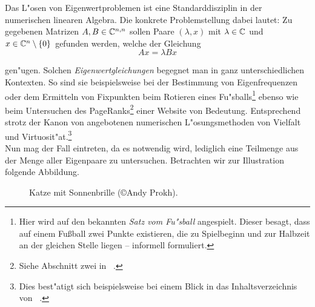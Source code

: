Das L"osen von Eigenwertproblemen ist eine Standarddisziplin in der
numerischen linearen Algebra. Die konkrete Problemstellung dabei lautet: Zu gegebenen Matrizen $A,B\in\mathbb{C}^{n,n}$ sollen Paare $(\lambda, x)$ mit $\lambda\in\mathbb{C}$ und $x\in\mathbb{C}^n \setminus\{0\}$ gefunden werden, welche
der Gleichung
\begin{equation}\label{eq:eigenproblem}
Ax = \lambda Bx
\end{equation}

gen"ugen. Solchen \emph{Eigenwertgleichungen} begegnet man in ganz unterschiedlichen Kontexten.
So sind sie beispielsweise bei der Bestimmung von Eigenfrequenzen oder dem Ermitteln von Fixpunkten beim
Rotieren eines Fu"sballs\footnote{Hier wird auf den bekannten
\emph{Satz vom Fu"sball} angespielt. Dieser besagt, dass auf einem Fußball
zwei Punkte existieren, die zu Spielbeginn und zur Halbzeit
an der gleichen Stelle liegen -- informell formuliert.} ebenso wie beim
Untersuchen des PageRanks\footnote{
Siehe Abschnitt zwei in ~\cite{page}.
} einer Website von
Bedeutung. Entsprechend strotz der Kanon von angebotenen numerischen
L"osungsmethoden von Vielfalt und Virtuosit"at.\footnote{Dies best"atigt sich beispielsweise bei einem Blick in das Inhaltsverzeichnis von ~\cite{stewart}.}\\

Nun mag der Fall eintreten, da es notwendig wird, lediglich eine Teilmenge
aus der Menge aller Eigenpaare zu untersuchen. Betrachten wir zur Illustration folgende Abbildung.

\begin{figure}[h!]\label{im:cat}
  \centering
  \caption{Katze mit Sonnenbrille (\copyright Andy Prokh).}
\end{figure}

